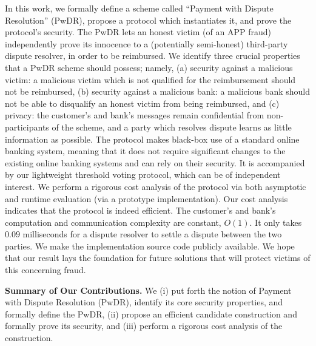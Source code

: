 In this work, we formally define a scheme called ``Payment with Dispute Resolution'' (PwDR),  propose a protocol which instantiates it, and  prove the protocol's security.  The PwDR lets an honest victim (of an APP fraud)  independently prove its innocence to a  (potentially semi-honest) third-party dispute resolver, in order to be reimbursed.  We identify three crucial properties that a PwDR scheme should possess; namely, (a) security against a malicious victim: a malicious victim  which is not qualified for the reimbursement should not be reimbursed, (b) security against a malicious bank: a malicious bank should not be able to disqualify an honest victim  from being reimbursed, and (c) privacy: the customer’s and bank’s messages remain confidential from non-participants of the scheme, and a party which resolves dispute  learns as little information as possible.  The  protocol makes black-box use of a standard  online banking system, meaning that it does not require significant changes to the existing online banking systems and can rely on their security. It is accompanied by our lightweight threshold voting protocol, which can be of independent interest. We perform a rigorous cost analysis of the protocol via both asymptotic and runtime  evaluation (via a prototype implementation). Our cost analysis indicates that the protocol is indeed efficient. The customer's and bank's computation and communication complexity are constant, $O(1)$. It only takes $0.09$ milliseconds for a dispute resolver to settle a dispute between the two parties. We  make  the implementation source code publicly available. We hope that our result lays the foundation for future solutions that will protect victims of this concerning  fraud. 



 


  





\vspace{2mm}

\noindent\textbf{Summary of Our Contributions.} We (i) put forth the notion of Payment with Dispute Resolution (PwDR), identify its core security properties, and  formally define the PwDR, (ii) propose an efficient candidate construction  and formally prove its security, and (iii) perform a rigorous cost analysis of the construction.     




